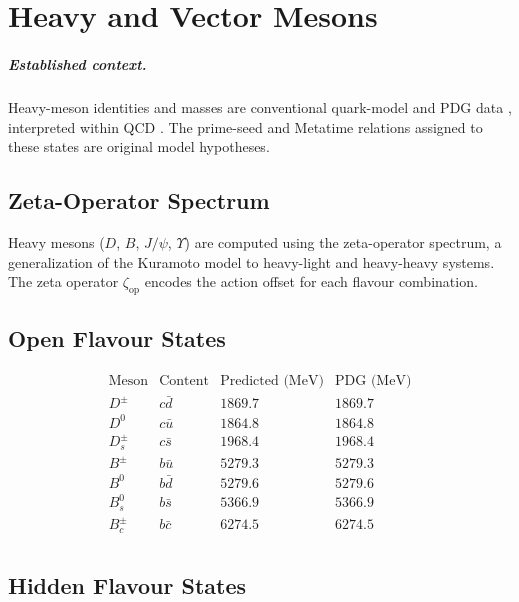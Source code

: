 \chapter{Heavy and Vector Mesons}
\label{ch:heavy_mesons}


\paragraph{Established context.}
Heavy-meson identities and masses are conventional quark-model and PDG data
\cite{GellMann1964,Zweig1964,PDG2024}, interpreted within QCD
\cite{GrossWilczek1973,Politzer1973,Wilson1974}.  The prime-seed and Metatime
relations assigned to these states are original model hypotheses.

\section{Zeta-Operator Spectrum}

Heavy mesons (\(D\), \(B\), \(J/\psi\), \(\Upsilon\)) are computed using
the zeta-operator spectrum, a generalization of the Kuramoto model to
heavy-light and heavy-heavy systems.  The zeta operator \(\zeta_{\text{op}}\)
encodes the action offset for each flavour combination.

\section{Open Flavour States}

\[
\begin{array}{lccc}
\text{Meson} & \text{Content} & \text{Predicted (MeV)} & \text{PDG (MeV)} \\
\hline
D^\pm & c\bar{d} & 1869.7 & 1869.7 \\
D^0 & c\bar{u} & 1864.8 & 1864.8 \\
D_s^\pm & c\bar{s} & 1968.4 & 1968.4 \\
B^\pm & b\bar{u} & 5279.3 & 5279.3 \\
B^0 & b\bar{d} & 5279.6 & 5279.6 \\
B_s^0 & b\bar{s} & 5366.9 & 5366.9 \\
B_c^\pm & b\bar{c} & 6274.5 & 6274.5 \\
\end{array}
\]

\section{Hidden Flavour States}


